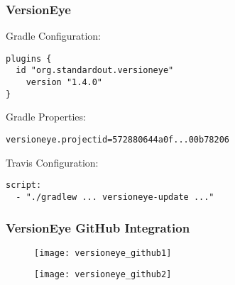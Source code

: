 
\begin{frame}[fragile] \frametitle{VersionEye} 
Gradle Configuration:
\begin{lstlisting}
plugins {
  id "org.standardout.versioneye"
    version "1.4.0"
}
\end{lstlisting}
\pause

Gradle Properties:
\begin{lstlisting}
versioneye.projectid=572880644a0f...00b78206
\end{lstlisting}
\pause


Travis Configuration:

\begin{lstlisting}
script:
  - "./gradlew ... versioneye-update ..."
\end{lstlisting}
 
\end{frame}


\begin{frame} \frametitle{VersionEye GitHub Integration} 


\begin{figure}[h]
\centering
  \texttt{[image: versioneye\_github1]}
\end{figure}
\begin{figure}[h]
\centering
  \texttt{[image: versioneye\_github2]}
\end{figure}
\end{frame}
